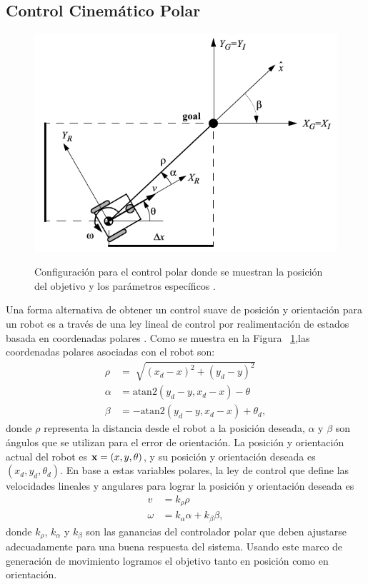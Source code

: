 \subsection{Control Cinem\'atico Polar}
\label{sec:ControlPolar}
\begin{figure}%
\centering \footnotesize
 {\includegraphics[width=0.60\linewidth]{images/control_polar.png}}
 \captionsetup{font=footnotesize}
 \caption{Configuración para el control polar donde se muestran la posición del 
 objetivo y los parámetros específicos \cite{siegwart2011introduction}.}
\label{f:controlPolar}
\end{figure}

Una forma alternativa de obtener un control suave de posición y orientación 
para un robot es a través de una ley lineal de control por realimentación 
de estados basada en coordenadas polares \cite{chwa2004sliding}. Como se muestra 
en la Figura ~\ref{f:controlPolar},las coordenadas polares asociadas con el robot 
son:
\begin{align*}
\rho &= \sqrt[]{(x_{d} - x)^2 + (y_{d} - y)^2} \\
\alpha &= \text{atan2}(y_{d} - y, x_{d} - x) - \theta \\
\beta &= -\text{atan2}(y_{d} - y, x_{d} - x) + \theta_{d},
\end{align*}
donde $\rho$ representa la distancia desde el robot a la posición deseada, $\alpha$
y $\beta$ son ángulos que se utilizan para el error de orientación. La posición y 
orientación actual del robot es $\mathbf x=(x,y,\theta)$, y su posición y orientación deseada 
es $(x_{d},y_{d},\theta_{d})$. En base a estas variables polares, la ley de control que 
define las velocidades lineales y angulares para lograr la posición y orientación deseada 
es 
\begin{align}
\label{eqn:v}
v &= k_{\rho}\rho \\
\label{eqn:w}
\omega &= k_{\alpha}\alpha + k_{\beta}\beta,
\end{align}
donde $k_{\rho}$, $k_{\alpha}$ y $k_{\beta}$ son las ganancias del controlador 
polar que deben ajustarse adecuadamente para una buena respuesta del sistema. Usando 
este marco de generación de movimiento logramos el objetivo tanto en posición 
como en orientación.

